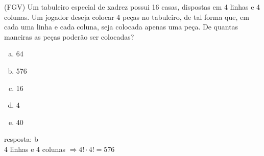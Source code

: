 \begin{ex}
 	(FGV) Um tabuleiro especial de xadrez possui 16 casas, dispostas em 4 linhas e 4 colunas. Um jogador deseja colocar 4 peças no tabuleiro, de tal forma que, em cada uma linha e cada coluna, seja colocada apenas uma peça. De quantas maneiras as peças poderão ser colocadas?
    \begin{enumerate}[(a)]
    \item 64
    \item 576
    \item 16
    \item 4
    \item 40
    \end{enumerate}
      \begin{sol}
        resposta: b \\
        4 linhas e 4 colunas $\Longrightarrow 4!\cdot4!=576$
      \end{sol}
\end{ex}